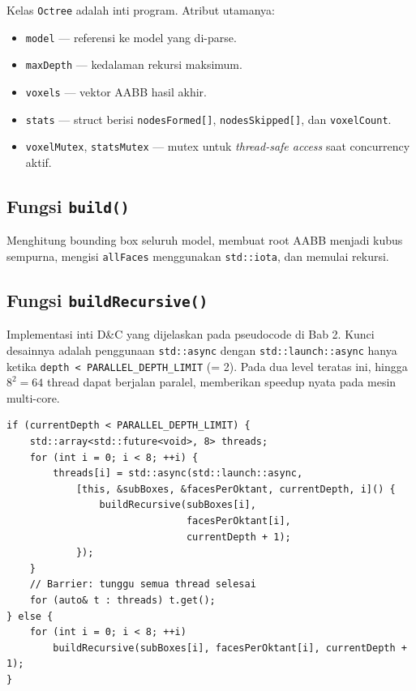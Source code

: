 \documentclass[12pt, a4paper]{report}
\begin{document}
Kelas \texttt{Octree} adalah inti program. Atribut utamanya:

\begin{itemize}
  \item \texttt{model} — referensi ke model yang di-parse.
  \item \texttt{maxDepth} — kedalaman rekursi maksimum.
  \item \texttt{voxels} — vektor AABB hasil akhir.
  \item \texttt{stats} — struct berisi \texttt{nodesFormed[]},
        \texttt{nodesSkipped[]}, dan \texttt{voxelCount}.
  \item \texttt{voxelMutex}, \texttt{statsMutex} — mutex untuk
        \textit{thread-safe access} saat concurrency aktif.
\end{itemize}

\subsection{Fungsi \texttt{build()}}

Menghitung bounding box seluruh model, membuat root AABB menjadi kubus
sempurna, mengisi \texttt{allFaces} menggunakan \texttt{std::iota},
dan memulai rekursi.

\subsection{Fungsi \texttt{buildRecursive()}}

Implementasi inti D\&C yang dijelaskan pada pseudocode di Bab 2.
Kunci desainnya adalah penggunaan \texttt{std::async} dengan
\texttt{std::launch::async} hanya ketika \texttt{depth < PARALLEL\_DEPTH\_LIMIT}
(= 2). Pada dua level teratas ini, hingga $8^2 = 64$ thread dapat
berjalan paralel, memberikan speedup nyata pada mesin multi-core.

\begin{lstlisting}[style=cpp, caption={Potongan implementasi concurrency},
  label={lst:async}]
if (currentDepth < PARALLEL_DEPTH_LIMIT) {
    std::array<std::future<void>, 8> threads;
    for (int i = 0; i < 8; ++i) {
        threads[i] = std::async(std::launch::async,
            [this, &subBoxes, &facesPerOktant, currentDepth, i]() {
                buildRecursive(subBoxes[i],
                               facesPerOktant[i],
                               currentDepth + 1);
            });
    }
    // Barrier: tunggu semua thread selesai
    for (auto& t : threads) t.get();
} else {
    for (int i = 0; i < 8; ++i)
        buildRecursive(subBoxes[i], facesPerOktant[i], currentDepth + 1);
}
\end{lstlisting}
\end{document}
